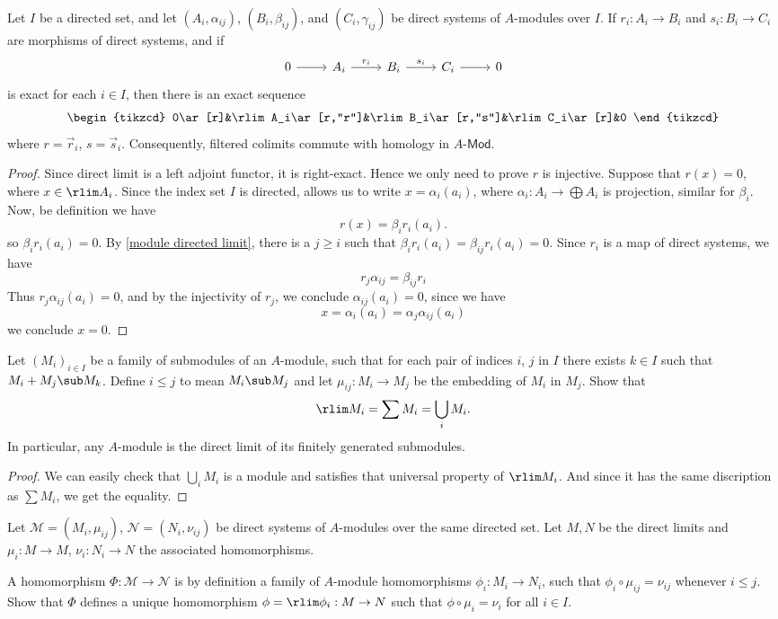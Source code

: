 \begin{exercise}\label{module directed limit exactness}
Let $I$ be a directed set, and let $(A_i,\alpha_{ij})$, $(B_i,\beta_{ij})$, and $(C_i,\gamma_{ij})$ be direct systems of $A$-modules over $I$. If $r_i:A_i\to B_i$ and $s_i:B_i\to C_i$ are morphisms of direct systems, and if
\[\begin{tikzcd}
0\ar[r]&A_i\ar[r,"r_i"]&B_i\ar[r,"s_i"]&C_i\ar[r]&0
\end{tikzcd}\]
is exact for each $i\in I$, then there is an exact sequence
\[\begin{tikzcd}
0\ar[r]&\rlim A_i\ar[r,"r"]&\rlim B_i\ar[r,"s"]&\rlim C_i\ar[r]&0
\end{tikzcd}\]
where $r=\vec{r}_i$, $s=\vec{s}_i$. Consequently, filtered colimits commute with homology in $A$-$\mathsf{Mod}$.
\end{exercise}
\begin{proof}
Since direct limit is a left adjoint functor, it is right-exact. Hence we only need to prove $r$ is injective. Suppose that $r(x)=0$, where $x\in\rlim A_i$. Since the index set $I$ is
directed, allows us to write $x=\alpha_i(a_i)$, where $\alpha_i:A_i\to\bigoplus A_i$ is projection, similar for $\beta_i$. Now, be definition we have
\[r(x)=\beta_ir_i(a_i).\]
so $\beta_ir_i(a_i)=0$. By \cref{module directed limit}, there is a $j\geq i$ such that $\beta_ir_i(a_i)=\beta_{ij}r_i(a_i)=0$. Since $r_i$ is a map of direct systems, we have
\[r_j\alpha_{ij}=\beta_{ij}r_i\]
Thus $r_j\alpha_{ij}(a_i)=0$, and by the injectivity of $r_j$, we conclude $\alpha_{ij}(a_i)=0$, since we have
\[x=\alpha_i(a_i)=\alpha_j\alpha_{ij}(a_i)\]
we conclude $x=0$. 
\end{proof}
\begin{exercise}
Let $(M_i)_{i\in I}$ be a family of submodules of an $A$-module, such that for each pair of indices $i$, $j$ in $I$ there exists $k\in I$ such that $M_i+M_j\sub M_k$. Define $i\leq j$ to mean $M_i\sub M_j$ and let $\mu_{ij}:M_i\to M_j$ be the embedding of $M_i$ in $M_j$. Show that
\[\rlim M_i=\sum M_i=\bigcup_iM_i.\]
In particular, any $A$-module is the direct limit of its finitely generated submodules.
\end{exercise}
\begin{proof}
We can easily check that $\bigcup_iM_i$ is a module and satisfies that universal property of $\rlim M_i$. And since it has the same discription as $\sum M_i$, we get the equality.
\end{proof}
\begin{exercise}
Let $\mathcal{M}=(M_i,\mu_{ij})$, $\mathcal{N}=(N_i,\nu_{ij})$ be direct systems of $A$-modules over the same directed set. Let $M,N$ be the direct limits and $\mu_i:M\to M$, $\nu_i:N_i\to N$ the associated homomorphisms.\par
A homomorphism $\Phi:\mathcal{M}\to\mathcal{N}$ is by definition a family of $A$-module homomorphisms $\phi_i:M_i\to N_i$, such that $\phi_i\circ\mu_{ij}=\nu_{ij}$ whenever $i\leq j$. Show that $\Phi$ defines a unique homomorphism $\phi=\rlim\phi_i:M\to N$ such that $\phi\circ\mu_i=\nu_i$ for all $i\in I$.
\end{exercise}
